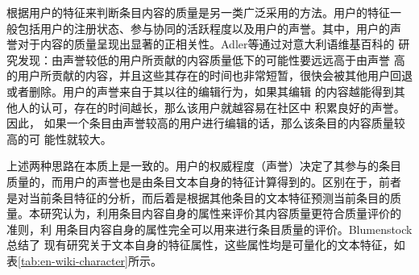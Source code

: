 根据用户的特征来判断条目内容的质量是另一类广泛采用的方法。用户的特征一
般包括用户的注册状态、参与协同的活跃程度以及用户的声誉。其中，用户的声
誉对于内容的质量呈现出显著的正相关性。Adler等通过对意大利语维基百科的
研究发现：由声誉较低的用户所贡献的内容质量低下的可能性要远远高于由声誉
高的用户所贡献的内容，并且这些其存在的时间也非常短暂，很快会被其他用户回退
或者删除\cite{Adler2008}。用户的声誉来自于其以往的编辑行为，如果其编辑
的内容越能得到其他人的认可，存在的时间越长，那么该用户就越容易在社区中
积累良好的声誉。因此，
如果一个条目由声誉较高的用户进行编辑的话，那么该条目的内容质量较高的可
能性就较大。

上述两种思路在本质上是一致的。用户的权威程度（声誉）决定了其参与的条目
质量的，而用户的声誉也是由条目文本自身的特征计算得到的。区别在于，前者
是对当前条目特征的分析，而后着是根据其他条目的文本特征预测当前条目的质
量。本研究认为，利用条目内容自身的属性来评价其内容质量更符合质量评价的
准则，利
用条目内容自身的属性完全可以用来进行条目质量的评价。Blumenstock总结了
现有研究关于文本自身的特征属性，这些属性均是可量化的文本特征，如表\ref{tab:en-wiki-character}所示。

